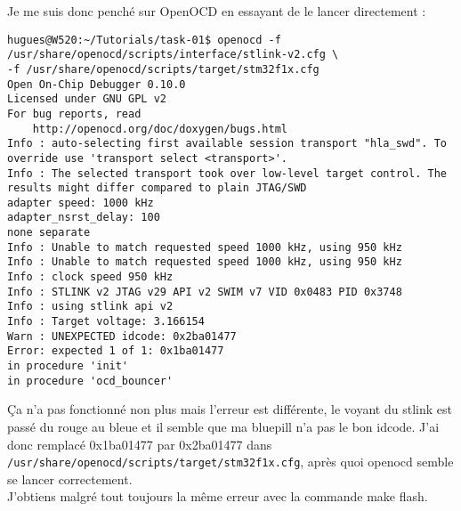Je me suis donc penché sur OpenOCD en essayant de le lancer directement :
{\scriptsize
\begin{verbatim}
hugues@W520:~/Tutorials/task-01$ openocd -f /usr/share/openocd/scripts/interface/stlink-v2.cfg \
-f /usr/share/openocd/scripts/target/stm32f1x.cfg 
Open On-Chip Debugger 0.10.0
Licensed under GNU GPL v2
For bug reports, read
	http://openocd.org/doc/doxygen/bugs.html
Info : auto-selecting first available session transport "hla_swd". To override use 'transport select <transport>'.
Info : The selected transport took over low-level target control. The results might differ compared to plain JTAG/SWD
adapter speed: 1000 kHz
adapter_nsrst_delay: 100
none separate
Info : Unable to match requested speed 1000 kHz, using 950 kHz
Info : Unable to match requested speed 1000 kHz, using 950 kHz
Info : clock speed 950 kHz
Info : STLINK v2 JTAG v29 API v2 SWIM v7 VID 0x0483 PID 0x3748
Info : using stlink api v2
Info : Target voltage: 3.166154
Warn : UNEXPECTED idcode: 0x2ba01477
Error: expected 1 of 1: 0x1ba01477
in procedure 'init' 
in procedure 'ocd_bouncer'
\end{verbatim}
}
Ça n'a pas fonctionné non plus mais l'erreur est différente, le voyant du stlink est
passé du rouge au bleue et il semble que ma bluepill n'a pas le bon idcode. J'ai donc
remplacé 0x1ba01477 par 0x2ba01477 dans
\texttt{/usr/share/openocd/scripts/target/stm32f1x.cfg}, après quoi openocd semble se
lancer correctement.\\

J'obtiens malgré tout toujours la même erreur avec la commande make flash.\\

